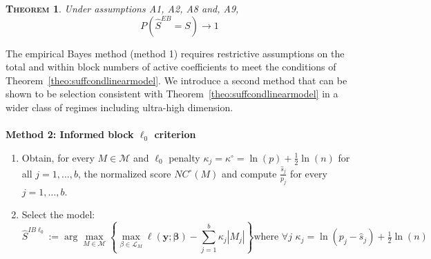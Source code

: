 \documentclass[aos]{imsart}
\theoremstyle{plain}
\newtheorem{thm}{\textsc{Theorem}}[section]
\newcommand{\bs}{\boldsymbol}
\begin{document}
\begin{thm}\label{theo:empbayesselconsist}
    Under assumptions A1, A2, A8 and, A9, 
$$P(\hat{S}^{EB} = S) \to 1$$
\end{thm}


The empirical Bayes method (method 1) requires restrictive assumptions on the total and within block numbers of active coefficients to meet the conditions of Theorem~\ref{theo:suffcondlinearmodel}. We introduce a second method that can be shown to be selection consistent with Theorem~\ref{theo:suffcondlinearmodel} in a wider class of regimes including ultra-high dimension.\\ \\
\textbf{Method 2: Informed block $\ell_0$ criterion}
\begin{enumerate}
    \item Obtain, for every $M\in \mathcal{M}$ and $\ell_0$ penalty $\kappa_j=\kappa^{\circ}=\ln(p)+\frac{1}{2}\ln(n)$ for all $j=1,\ldots,b$, the normalized score $NC^{\circ}(M)$  and compute $\frac{\hat{s}_j}{p_j}$ for every $j=1,\ldots,b$.
    \item Select the model:
    \begin{equation*}
    \hat{S}^{IB\ell_0}:= \arg\max_{M\in \mathcal{M}} \left\{\max_{\beta\in \mathcal{L}_M}\ell(\bs y; \bs \beta)-\sum_{j=1}^b\kappa_j |M_j| \right\}
    \text{where} \,\,\forall j\,\,\kappa_j = \ln(p_j-\hat{s}_j)+ \tfrac{1}{2}\ln(n)
    \end{equation*}  
\end{enumerate}
\end{document}
